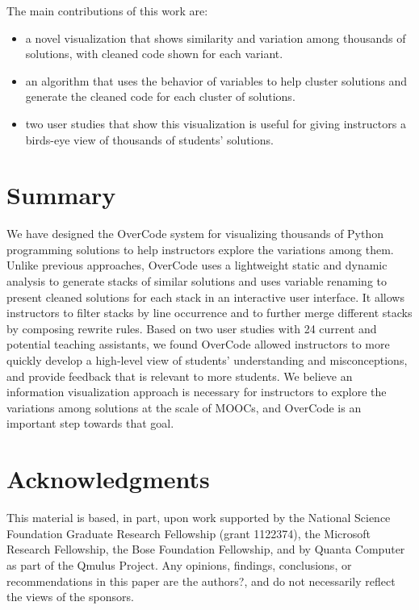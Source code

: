\documentclass{sigchi}
\begin{document}
The main contributions of this work are:
\begin{itemize}
\item a novel visualization that shows similarity and variation among thousands of solutions, with cleaned code shown for each variant. 
\item an algorithm that uses the behavior of variables to help cluster solutions and generate the cleaned code for each cluster of solutions.
\item two user studies that show this visualization is useful for giving instructors a birds-eye view of thousands of students' solutions.
\end{itemize}

\section{Summary}
We have designed the OverCode system for visualizing thousands of Python programming solutions to help instructors explore the variations among them. Unlike previous approaches, OverCode uses a lightweight static and dynamic analysis to generate stacks of similar solutions and uses variable renaming to present cleaned solutions for each stack in an interactive user interface. It allows instructors to filter stacks by line occurrence and to further merge different stacks by composing rewrite rules. Based on two user studies with 24 current and potential teaching assistants, we found OverCode allowed instructors to more quickly develop a high-level view of students' understanding and misconceptions, and provide feedback that is relevant to more students. We believe an information visualization approach is necessary for instructors to explore the variations among solutions at the scale of MOOCs, and OverCode is an important step towards that goal. 	

\section{Acknowledgments}

This material is based, in part, upon work supported by the National Science Foundation Graduate Research Fellowship (grant 1122374), the Microsoft Research Fellowship, the Bose Foundation Fellowship, and by Quanta Computer as part of the Qmulus Project. Any opinions, findings, conclusions, or recommendations in this paper are the authors?, and do not necessarily reflect the views of the sponsors.
\end{document}
